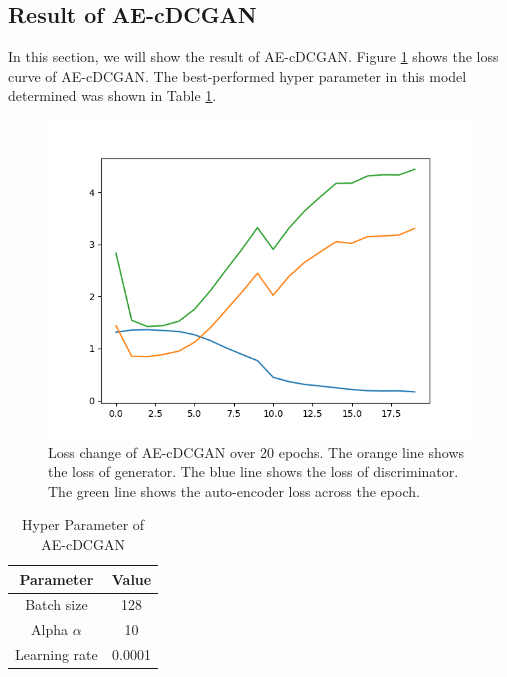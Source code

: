 \documentclass{article}
\begin{document}
\subsection{Result of AE-cDCGAN}
In this section, we will show the result of AE-cDCGAN. Figure \ref{cdcgan_loss} shows the loss curve of AE-cDCGAN. The best-performed hyper parameter in this model determined was shown in Table \ref{table: AE-cDCGAN}.
\begin{figure}[H]
\begin{center}
  \centering
  \includegraphics[scale=0.5]{image/loss_curve_AECDCGAN.png}
\end{center}
\caption{Loss change of AE-cDCGAN over 20 epochs. The orange line shows the loss of generator. The blue line shows the loss of discriminator. The green line shows the auto-encoder loss across the epoch.}
\label{cdcgan_loss}
\end{figure}

\begin{table}[H]
  \caption{Hyper Parameter of AE-cDCGAN}
  \label{table: AE-cDCGAN}
  \centering
  \begin{tabular}{cc}
    \toprule
    \cmidrule(r){1-2}
    Parameter    &Value\\
    \midrule
    Batch size           &128\\
    Alpha $\alpha$       &10\\
    Learning rate        &0.0001\\
    \bottomrule
  \end{tabular}
\end{table}
\end{document}
